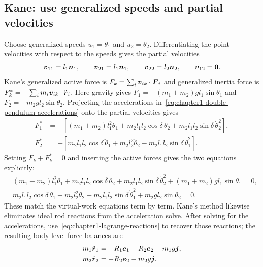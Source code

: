 \documentclass[../main.tex]{subfiles}
\begin{document}
\subsection{Kane: use generalized speeds and partial velocities}

Choose generalized speeds $u_1=\dot\theta_1$ and $u_2=\dot\theta_2$. Differentiating the point velocities with respect to the speeds gives the partial velocities
\begin{equation}
\boldsymbol{v}_{11}=l_1\boldsymbol{n}_1,\qquad
\boldsymbol{v}_{21}=l_1\boldsymbol{n}_1,\qquad
\boldsymbol{v}_{22}=l_2\boldsymbol{n}_2,\qquad
\boldsymbol{v}_{12}=\boldsymbol{0}.
\label{eq:chapter1-kane-partial-velocities}
\end{equation}
Kane's generalized active force is $F_k=\sum_i\boldsymbol{v}_{ik}\cdot\boldsymbol{F}_i$ and generalized inertia force is $F_k^*=-\sum_i m_i\boldsymbol{v}_{ik}\cdot\ddot{\boldsymbol{r}}_i$. Here gravity gives $F_1=-(m_1+m_2)gl_1\sin\theta_1$ and $F_2=-m_2gl_2\sin\theta_2$. Projecting the accelerations in~\eqref{eq:chapter1-double-pendulum-accelerations} onto the partial velocities gives
\begin{equation}
\begin{aligned}
F_1^*&=-\left[(m_1+m_2)l_1^2\ddot\theta_1
+m_2l_1l_2\cos\delta\,\ddot\theta_2
+m_2l_1l_2\sin\delta\,\dot\theta_2^2\right],\\
F_2^*&=-\left[m_2l_1l_2\cos\delta\,\ddot\theta_1
+m_2l_2^2\ddot\theta_2
-m_2l_1l_2\sin\delta\,\dot\theta_1^2\right].
\end{aligned}
\label{eq:chapter1-kane-double-pendulum}
\end{equation}
Setting $F_k+F_k^*=0$ and inserting the active forces gives the two equations explicitly:
\begin{equation}
\begin{aligned}
&(m_1+m_2)l_1^2\ddot\theta_1+m_2l_1l_2\cos\delta\,\ddot\theta_2
+m_2l_1l_2\sin\delta\,\dot\theta_2^2
+(m_1+m_2)gl_1\sin\theta_1=0,\\
&m_2l_1l_2\cos\delta\,\ddot\theta_1+m_2l_2^2\ddot\theta_2
-m_2l_1l_2\sin\delta\,\dot\theta_1^2
+m_2gl_2\sin\theta_2=0.
\end{aligned}
\label{eq:chapter1-kane-reduced-equations}
\end{equation}
These match the virtual-work equations term by term. Kane's method likewise eliminates ideal rod reactions from the acceleration solve. After solving for the accelerations, use~\eqref{eq:chapter1-lagrange-reactions} to recover those reactions; the resulting body-level force balances are
\begin{equation}
\begin{aligned}
m_1\ddot{\boldsymbol{r}}_1 &= -R_1\boldsymbol{e}_1+R_2\boldsymbol{e}_2-m_1g\boldsymbol{j},\\
m_2\ddot{\boldsymbol{r}}_2 &= -R_2\boldsymbol{e}_2-m_2g\boldsymbol{j}.
\end{aligned}
\label{eq:chapter1-kane-common-form}
\end{equation}
\end{document}
